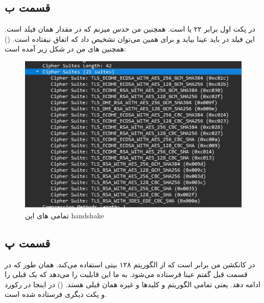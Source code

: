 \documentclass[]{article}
\begin{document}
\subsection*{قسمت ب}
در پکت اول
 برابر ۲۲ یا  است.
همچنین من حدس میزنم که در
مقدار
همان فیلد
است. این فیلد در
باید عینا بیاید و برای همین می‌توان تشخیص داد که
اتفاق نیفتاده است.
()
همچنین
های
من در شکل زیر آمده است:
\begin{figure}[h]
    \centering
    \includegraphics[scale=0.5]{pics/tls-ciphers.jpg}
    \caption{تمامی های این handshake}
\end{figure}
\subsection*{قسمت پ}
در کانکشن من  برابر
است که از الگوریتم
 ۱۲۸ بیتی استفاده می‌کند.
همان طور که در قسمت قبل گفتم
عینا فرستاده می‌شود.
به ما این قابلیت را می‌دهد که یک
قبلی را ادامه دهد. یعنی تمامی الگوریتم و کلید‌ها و غیره همان قبلی هستد.
()
در اینجا
در رکورد و پکت دیگری فرستاده شده است.
\end{document}
